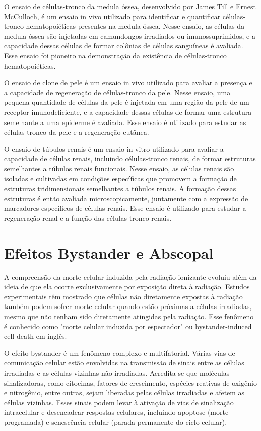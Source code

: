 \documentclass[11pt,a4paper]{article}
\begin{document}
	O ensaio de células-tronco da medula óssea, desenvolvido por James Till e Ernest McCulloch, é um ensaio in vivo utilizado para identificar e quantificar células-tronco hematopoiéticas presentes na medula óssea. Nesse ensaio, as células da medula óssea são injetadas em camundongos irradiados ou imunossuprimidos, e a capacidade dessas células de formar colônias de células sanguíneas é avaliada. Esse ensaio foi pioneiro na demonstração da existência de células-tronco hematopoiéticas.

	O ensaio de clone de pele é um ensaio in vivo utilizado para avaliar a presença e a capacidade de regeneração de células-tronco da pele. Nesse ensaio, uma pequena quantidade de células da pele é injetada em uma região da pele de um receptor imunodeficiente, e a capacidade dessas células de formar uma estrutura semelhante a uma epiderme é avaliada. Esse ensaio é utilizado para estudar as células-tronco da pele e a regeneração cutânea.

	O ensaio de túbulos renais é um ensaio in vitro utilizado para avaliar a capacidade de células renais, incluindo células-tronco renais, de formar estruturas semelhantes a túbulos renais funcionais. Nesse ensaio, as células renais são isoladas e cultivadas em condições específicas que promovem a formação de estruturas tridimensionais semelhantes a túbulos renais. A formação dessas estruturas é então avaliada microscopicamente, juntamente com a expressão de marcadores específicos de células renais. Esse ensaio é utilizado para estudar a regeneração renal e a função das células-tronco renais.

\section{Efeitos Bystander e Abscopal}

	A compreensão da morte celular induzida pela radiação ionizante evoluiu além da ideia de que ela ocorre exclusivamente por exposição direta à radiação. Estudos experimentais têm mostrado que células não diretamente expostas à radiação também podem sofrer morte celular quando estão próximas a células irradiadas, mesmo que não tenham sido diretamente atingidas pela radiação. Esse fenômeno é conhecido como "morte celular induzida por espectador" ou bystander-induced cell death em inglês.

	O efeito bystander é um fenômeno complexo e multifatorial. Várias vias de comunicação celular estão envolvidas na transmissão de sinais entre as células irradiadas e as células vizinhas não irradiadas. Acredita-se que moléculas sinalizadoras, como citocinas, fatores de crescimento, espécies reativas de oxigênio e nitrogênio, entre outras, sejam liberadas pelas células irradiadas e afetem as células vizinhas. Esses sinais podem levar à ativação de vias de sinalização intracelular e desencadear respostas celulares, incluindo apoptose (morte programada) e senescência celular (parada permanente do ciclo celular).
\end{document}
